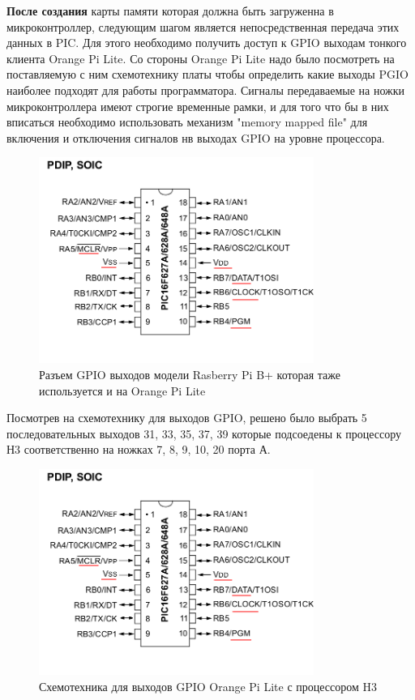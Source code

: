 \textbf{После создания} карты памяти которая должна быть загруженна в микроконтроллер, следующим 
шагом является непосредственная передача этих данных в PIC. Для этого необходимо получить доступ 
к GPIO выходам тонкого клиента Orange Pi Lite. Со стороны Orange Pi Lite надо было посмотреть на 
поставляемую с ним схемотехнику платы чтобы определить какие выходы PGIO наиболее подходят для работы программатора.
Сигналы передаваемые на ножки микроконтроллера имеют строгие временные рамки, и для того что бы в них вписаться необходимо 
использовать механизм "memory mapped file" для включения и отключения сигналов нв выходах GPIO на уровне процессора.


\begin{figure}[h!]
    \centering
    \includegraphics[width=0.8\textwidth]{2017-05-07_at_22:31:52_screenshot.png}
    \caption{Разъем GPIO выходов модели Rasberry Pi B+ которая таже используется и на Orange Pi Lite}
\end{figure}

Посмотрев на схемотехнику для выходов GPIO, решено было выбрать 5 последовательных 
выходов 31, 33, 35, 37, 39 которые подсоедены к процессору Н3 соответственно на ножках 7, 8, 9, 10, 20 порта А.

\begin{figure}[h!]
    \centering
    \includegraphics[width=0.8\textwidth]{2017-05-07_at_22:31:52_screenshot.png}
    \caption{Схемотехника для выходов GPIO Orange Pi Lite с процессором H3}
\end{figure}

